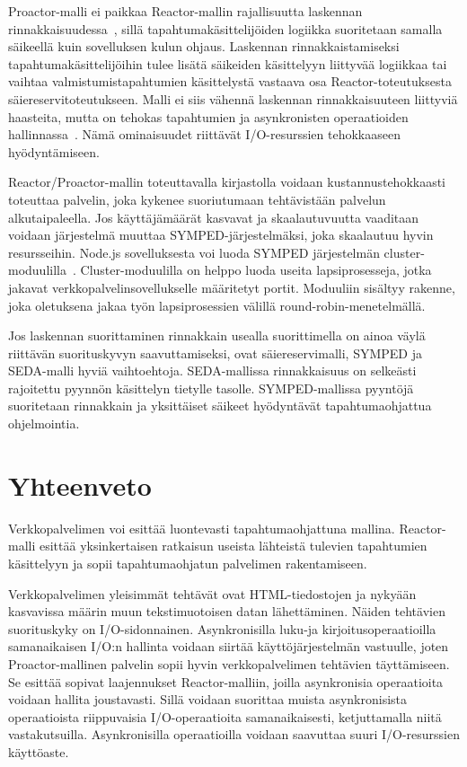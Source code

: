 \documentclass[finnish]{tktltiki2}%
\theoremstyle{definition}
\theoremstyle{remark}
\begin{document}
Proactor-malli ei paikkaa
Reactor-mallin rajallisuutta laskennan rinnakkaisuudessa~\cite{pyarali_proactor_1997},
sillä tapahtumakäsittelijöiden logiikka suoritetaan
samalla säikeellä kuin sovelluksen kulun ohjaus.
Laskennan rinnakkaistamiseksi tapahtumakäsittelijöihin
tulee lisätä säikeiden käsittelyyn liittyvää logiikkaa
tai vaihtaa valmistumistapahtumien käsittelystä vastaava
osa Reactor-toteutuksesta säiereservitoteutukseen.
Malli ei siis vähennä laskennan rinnakkaisuuteen liittyviä
haasteita, mutta on tehokas tapahtumien ja asynkronisten
operaatioiden hallinnassa~\cite{hu_applying_1998}.
Nämä ominaisuudet riittävät
I/O-resurssien tehokkaaseen hyödyntämiseen.

Reactor/Proactor-mallin toteuttavalla
kirjastolla voidaan kustannustehokkaasti
toteuttaa palvelin, joka kykenee suoriutumaan
tehtävistään palvelun alkutaipaleella. Jos
käyttäjämäärät kasvavat ja skaalautuvuutta
vaaditaan voidaan järjestelmä muuttaa SYMPED-järjestelmäksi,
joka skaalautuu hyvin resursseihin.
Node.js sovelluksesta voi luoda SYMPED järjestelmän
cluster-moduulilla~\cite{noauthor_cluster_nodate}.
Cluster-moduulilla on helppo luoda useita lapsiprosesseja,
jotka jakavat verkkopalvelinsovellukselle määritetyt
portit. Moduuliin sisältyy rakenne,
joka oletuksena jakaa työn lapsiprosessien välillä
round-robin-menetelmällä.

Jos laskennan suorittaminen rinnakkain usealla suorittimella
on ainoa väylä riittävän suorituskyvyn saavuttamiseksi,
ovat säiereservimalli, SYMPED ja SEDA-malli hyviä vaihtoehtoja.
SEDA-mallissa rinnakkaisuus on selkeästi rajoitettu
pyynnön käsittelyn tietylle tasolle.
SYMPED-mallissa pyyntöjä suoritetaan rinnakkain
ja yksittäiset säikeet hyödyntävät
tapahtumaohjattua ohjelmointia.
\section{Yhteenveto}\label{sec:yhteenveto}

Verkkopalvelimen voi esittää luontevasti
tapahtumaohjattuna mallina. Reactor-malli esittää yksinkertaisen
ratkaisun useista lähteistä tulevien tapahtumien käsittelyyn 
ja sopii tapahtumaohjatun palvelimen rakentamiseen.

Verkkopalvelimen yleisimmät tehtävät ovat
HTML-tiedostojen ja nykyään kasvavissa määrin
muun tekstimuotoisen datan lähettäminen.
Näiden tehtävien suorituskyky on
I/O-sidonnainen.
Asynkronisilla luku-ja kirjoitusoperaatioilla samanaikaisen I/O:n hallinta
voidaan siirtää käyttöjärjestelmän vastuulle, joten Proactor-mallinen palvelin
sopii hyvin
verkkopalvelimen tehtävien täyttämiseen.
Se esittää sopivat laajennukset Reactor-malliin, joilla
asynkronisia operaatioita voidaan hallita joustavasti.
Sillä voidaan suorittaa muista asynkronisista operaatioista riippuvaisia I/O-operaatioita
samanaikaisesti, ketjuttamalla niitä vastakutsuilla.
Asynkronisilla operaatioilla voidaan saavuttaa suuri I/O-resurssien
käyttöaste.
\end{document}
